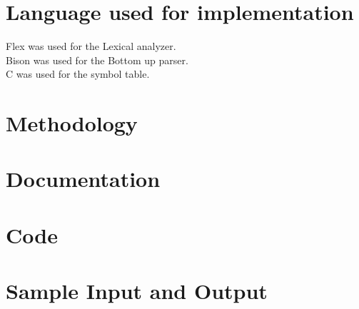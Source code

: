 \documentclass[12pt]{article}
\begin{document}
\section{Language used for implementation}
Flex was used for the Lexical analyzer.\\
Bison was used for the Bottom up parser.\\
C was used for the symbol table.\\
\section{Methodology}


\section{Documentation}


\section{Code}


\section{Sample Input and Output}
\end{document}
